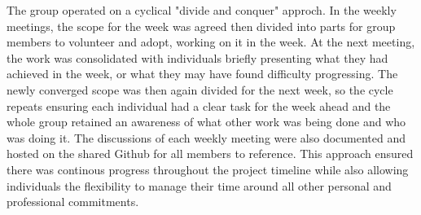 \documentclass[10pt]{article}\usepackage[]{graphicx}\usepackage[]{color}
\begin{document}
The group operated on a cyclical "divide and conquer" approch. In the weekly meetings, the scope for the week was agreed then divided into parts for group members to volunteer and adopt, working on it in the week. At the next meeting, the work was consolidated with individuals briefly presenting what they had achieved in the week, or what they may have found difficulty progressing. The newly converged scope was then again divided for the next week, so the cycle repeats ensuring each individual had a clear task for the week ahead and the whole group retained an awareness of what other work was being done and who was doing it. The discussions of each weekly meeting were also documented and hosted on the shared Github for all members to reference. This approach ensured there was continous progress throughout the project timeline while also allowing individuals the flexibility to manage their time around all other personal and professional commitments. \\
\end{document}
